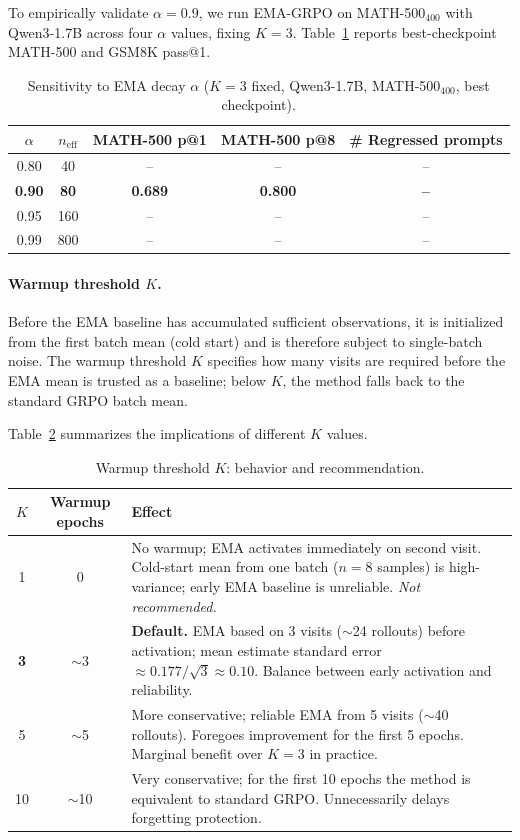 \documentclass[11pt]{article}
\newcommand{\method}{EMA-GRPO}
\theoremstyle{definition}
\begin{document}
To empirically validate $\alpha=0.9$, we run \method{} on
MATH-500$_{\text{400}}$ with Qwen3-1.7B across four $\alpha$ values,
fixing $K=3$.
Table~\ref{tab:hparam_alpha} reports best-checkpoint MATH-500 and GSM8K
pass@1.

\begin{table}[h]
\centering
\caption{Sensitivity to EMA decay $\alpha$ ($K=3$ fixed, Qwen3-1.7B,
  MATH-500$_{\text{400}}$, best checkpoint).}
\label{tab:hparam_alpha}
\small
\begin{tabular}{ccccc}
\toprule
$\alpha$ & $n_{\mathrm{eff}}$ & MATH-500 p@1 & MATH-500 p@8 & \# Regressed prompts \\
\midrule
0.80 &  40 & -- & -- & -- \\
\textbf{0.90} & \textbf{80} & \textbf{0.689} & \textbf{0.800} & \textbf{--} \\
0.95 & 160 & -- & -- & -- \\
0.99 & 800 & -- & -- & -- \\
\bottomrule
\end{tabular}
\end{table}

\paragraph{Warmup threshold $K$.}
Before the EMA baseline has accumulated sufficient observations, it is
initialized from the first batch mean (cold start) and is therefore
subject to single-batch noise.
The warmup threshold $K$ specifies how many visits are required before
the EMA mean is trusted as a baseline; below $K$, the method falls back
to the standard GRPO batch mean.

Table~\ref{tab:warmup_tradeoff} summarizes the implications of different $K$
values.

\begin{table}[h]
\centering
\caption{Warmup threshold $K$: behavior and recommendation.}
\label{tab:warmup_tradeoff}
\small
\begin{tabular}{ccp{7.5cm}}
\toprule
$K$ & Warmup epochs & Effect \\
\midrule
1 & 0 & No warmup; EMA activates immediately on second visit.
        Cold-start mean from one batch ($n=8$ samples) is high-variance;
        early EMA baseline is unreliable. \emph{Not recommended.} \\
\textbf{3} & $\sim$3 & \textbf{Default.} EMA based on 3 visits ($\sim$24 rollouts) before activation;
        mean estimate standard error $\approx 0.177/\sqrt{3} \approx 0.10$.
        Balance between early activation and reliability. \\
5 & $\sim$5 & More conservative; reliable EMA from 5 visits ($\sim$40 rollouts).
        Foregoes improvement for the first 5 epochs.
        Marginal benefit over $K=3$ in practice. \\
10 & $\sim$10 & Very conservative; for the first 10 epochs the method is
        equivalent to standard GRPO. Unnecessarily delays forgetting protection. \\
\bottomrule
\end{tabular}
\end{table}
\end{document}
